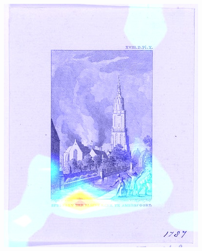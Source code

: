 \begin{figure}[!htb]
\endminipage
{}
  \includegraphics[width=\linewidth]{./Images/Chapter04/rijksnet_saliencies_1.jpeg}
\endminipage


\end{figure}
